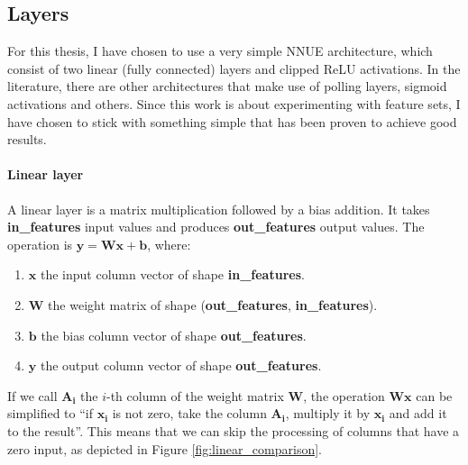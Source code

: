 \subsection{Layers}

For this thesis, I have chosen to use a very simple NNUE architecture, which consist of two linear (fully connected) layers and clipped ReLU activations. In the literature, there are other architectures that make use of polling layers, sigmoid activations and others. Since this work is about experimenting with feature sets, I have chosen to stick with something simple that has been proven to achieve good results.

\paragraph[short]{Linear layer} A linear layer is a matrix multiplication followed by a bias addition. It takes \textbf{in\_features} input values and produces \textbf{out\_features} output values. The operation is $\bm{y} = \bm{W} \bm{x} + \bm{b}$, where:

\begin{enumerate}
\item $\bm{x}$ the input column vector of shape \textbf{in\_features}.
\item $\bm{W}$ the weight matrix of shape (\textbf{out\_features}, \textbf{in\_features}).
\item $\bm{b}$ the bias column vector of shape \textbf{out\_features}.
\item $\bm{y}$ the output column vector of shape \textbf{out\_features}.
\end{enumerate}

If we call $\bm{A_i}$ the $i$-th column of the weight matrix $\bm{W}$, the operation $\bm{W} \bm{x}$ can be simplified to \enquote{if $\bm{x_i}$ is not zero, take the column $\bm{A_i}$, multiply it by $\bm{x_i}$ and add it to the result}. This means that we can skip the processing of columns that have a zero input, as depicted in Figure \ref{fig:linear_comparison}.

